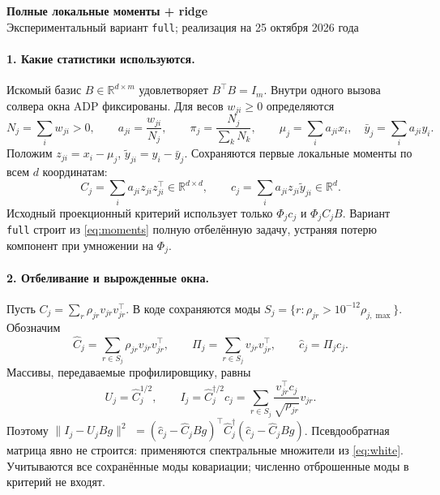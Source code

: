 \documentclass[11pt,a4paper]{article}
\newcommand{\R}{\mathbb R}
\newcommand{\norm}[1]{\lVert#1\rVert}
\newcommand{\code}[1]{\nolinkurl{#1}}
\begin{document}
\begin{center}
{\Large\bfseries Полные локальные моменты + ridge}\\[4pt]
{\small Экспериментальный вариант \code{full}; реализация на 25 октября 2026 года}
\end{center}

\paragraph{1. Какие статистики используются.}
Искомый базис $B\in\R^{d\times m}$ удовлетворяет $B^\top B=I_m$.
Внутри одного вызова солвера окна ADP фиксированы. Для весов $w_{ji}\ge0$
определяются
\[
 N_j=\sum_iw_{ji}>0,\qquad a_{ji}=\frac{w_{ji}}{N_j},\qquad
 \pi_j=\frac{N_j}{\sum_kN_k},\qquad
 \mu_j=\sum_i a_{ji}x_i,\quad \bar y_j=\sum_i a_{ji}y_i.
\]
Положим $z_{ji}=x_i-\mu_j$, $\widetilde y_{ji}=y_i-\bar y_j$. Сохраняются
первые локальные моменты по всем $d$ координатам:
\begin{equation}\label{eq:moments}
 C_j=\sum_i a_{ji}z_{ji}z_{ji}^\top\in\R^{d\times d},\qquad
 c_j=\sum_i a_{ji}z_{ji}\widetilde y_{ji}\in\R^d.
\end{equation}
Исходный проекционный критерий использует только
$\Phi_jc_j$ и $\Phi_jC_jB$. Вариант \code{full} строит из \eqref{eq:moments}
полную отбелённую задачу, устраняя потерю компонент при умножении на $\Phi_j$.

\paragraph{2. Отбеливание и вырожденные окна.}
Пусть $C_j=\sum_r\rho_{jr}v_{jr}v_{jr}^\top$. В коде сохраняются моды
$S_j=\{r:\rho_{jr}>10^{-12}\rho_{j,\max}\}$. Обозначим
\[
 \widehat C_j=\sum_{r\in S_j}\rho_{jr}v_{jr}v_{jr}^\top,\qquad
 \Pi_j=\sum_{r\in S_j}v_{jr}v_{jr}^\top,\qquad \widehat c_j=\Pi_jc_j.
\]
Массивы, передаваемые профилировщику, равны
\begin{equation}\label{eq:white}
 U_j=\widehat C_j^{1/2},\qquad
 I_j=\widehat C_j^{\dagger/2}c_j
     =\sum_{r\in S_j}\frac{v_{jr}^\top c_j}{\sqrt{\rho_{jr}}}v_{jr}.
\end{equation}
Поэтому $\norm{I_j-U_jBg}^2$
$=(\widehat c_j-\widehat C_jBg)^\top\widehat C_j^\dagger
(\widehat c_j-\widehat C_jBg)$.
Псевдообратная матрица явно не строится: применяются спектральные множители
из \eqref{eq:white}. Учитываются все сохранённые моды ковариации;
численно отброшенные моды в критерий не входят.
\end{document}

